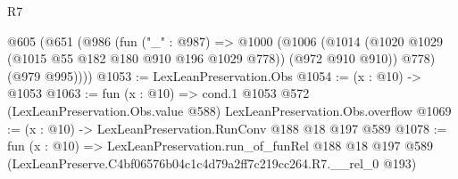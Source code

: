 \begin{lexlean}{R7}
\begin{coremodule}
  @605
    (@651
      (@986
        (fun ("_" : @987) =>
        @1000
          (@1006
            (@1014 (@1020 @1029 (@1015 @55 @182 @180 @910 @196 @1029 @778)) (@972 @910 @910))
            @778)
          (@979 @995))))
@1053 := LexLeanPreservation.Obs
@1054 := (x : @10) -> @1053
@1063 := fun (x : @10) =>
  cond.{1} @1053 @572 (LexLeanPreservation.Obs.value @588) LexLeanPreservation.Obs.overflow
@1069 := (x : @10) -> LexLeanPreservation.RunConv @188 @18 @197 @589
@1078 := fun (x : @10) =>
  LexLeanPreservation.run_of_funRel
    @188
    @18
    @197
    @589
    (LexLeanPreserve.C4bf06576b04c1c4d79a2ff7c219cc264.R7.__rel_0 @193)
\end{coremodule}
\end{lexlean}
